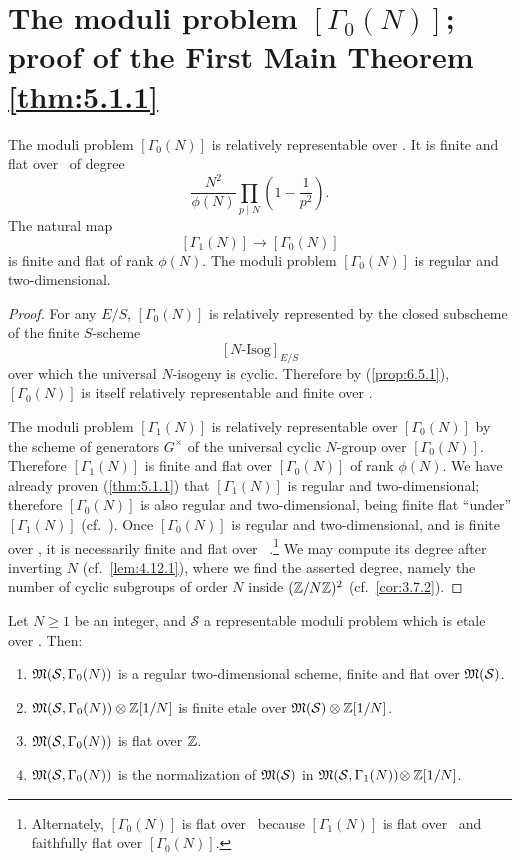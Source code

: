 \section{The moduli problem \texorpdfstring{$[\Gamma_0(N)]$}{[Gamma\_0(N)]}; proof of the First Main Theorem \ref{thm:5.1.1}}
\label{sec:6.6}

\begin{kthm}\label{thm:6.6.1}
The moduli problem $[\Gamma_0(N)]$ is relatively representable over \Ell. It is finite and flat over \Ell\ of degree
\[
\frac{N^2}{\phi(N)} \prod_{p \mid N} \left(1 - \frac{1}{p^2}\right).
\]
The natural map
\[
[\Gamma_1(N)] \to [\Gamma_0(N)]
\]
is finite and flat of rank $\phi(N)$. The moduli problem $[\Gamma_0(N)]$ is regular and two-dimensional.
\end{kthm}

\begin{proof}
For any $E/S$, $[\Gamma_0(N)]$ is relatively represented by the closed subscheme of the finite $S$-scheme
\[
[N\text{-Isog}]_{E/S}
\]
over which the universal $N$-isogeny is cyclic. Therefore by (\ref{prop:6.5.1}), $[\Gamma_0(N)]$ is itself relatively representable and finite over \Ell.

The moduli problem $[\Gamma_1(N)]$ is relatively representable over $[\Gamma_0(N)]$ by the scheme of generators $G^\times$ of the universal cyclic $N$-group over $[\Gamma_0(N)]$. Therefore $[\Gamma_1(N)]$ is finite and flat over $[\Gamma_0(N)]$ of rank $\phi(N)$. We have already proven (\ref{thm:5.1.1}) that $[\Gamma_1(N)]$ is regular and two-dimensional; therefore $[\Gamma_0(N)]$ is also regular and two-dimensional, being finite flat ``under'' $[\Gamma_1(N)]$ (cf.\ \cite[VII, 4.8]{AK1}). Once $[\Gamma_0(N)]$ is regular and two-dimensional, and is finite over \Ell, it is necessarily finite and flat over \Ell\ \cite[V, 3.8]{AK1}.\footnote{Alternately, $[\Gamma_0(N)]$ is flat over \Ell\ because $[\Gamma_1(N)]$ is flat over \Ell\ and faithfully flat over $[\Gamma_0(N)]$.} We may compute its degree after inverting $N$ (cf.\ \ref{lem:4.12.1}), where we find the asserted degree, namely the number of cyclic subgroups of order $N$ inside $(\mathbb{Z}/N\mathbb{Z})^2$ (cf.\ \ref{cor:3.7.2}).
\end{proof}

\begin{kthm}\label{thm:6.6.2}
Let $N \ge 1$ be an integer, and $\mathcal{S}$ a representable moduli problem which is etale over \Ell. Then:
\begin{enumerate}[(1)]
\item $\mathfrak{M}(\mathcal{S}, \Gamma_0(N))$ is a regular two-dimensional scheme, finite and flat over $\mathfrak{M}(\mathcal{S})$.
\item $\mathfrak{M}(\mathcal{S}, \Gamma_0(N)) \otimes \mathbb{Z}[1/N]$ is finite etale over $\mathfrak{M}(\mathcal{S}) \otimes \mathbb{Z}[1/N]$.
\item $\mathfrak{M}(\mathcal{S}, \Gamma_0(N))$ is flat over $\mathbb{Z}$.
\item $\mathfrak{M}(\mathcal{S}, \Gamma_0(N))$ is the normalization of $\mathfrak{M}(\mathcal{S})$ in $\mathfrak{M}(\mathcal{S}, \Gamma_1(N))\!\otimes \mathbb{Z}[1/N]$.
\end{enumerate}
\end{kthm}

